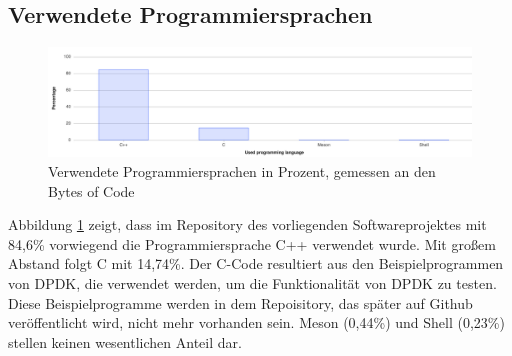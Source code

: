 \documentclass[../review_3.tex]{subfiles}
\begin{document}
\subsection{Verwendete Programmiersprachen}
\begin{figure} [H]
    \centering
    \includegraphics[width =0.95\linewidth]{img/gitlab1.png}
    \caption{Verwendete Programmiersprachen in Prozent, gemessen an den Bytes of Code}
    \label{gitlab1}
\end{figure}
Abbildung \ref{gitlab1} zeigt, dass im Repository des vorliegenden Softwareprojektes mit 84,6\%  vorwiegend die Programmiersprache C++ verwendet wurde. Mit großem Abstand folgt C mit 14,74\%. Der C-Code resultiert aus den Beispielprogrammen von DPDK, die verwendet werden, um die Funktionalität von DPDK zu testen. Diese Beispielprogramme werden in dem Repoisitory, das später auf Github veröffentlicht wird, nicht mehr vorhanden sein. Meson (0,44\%) und Shell (0,23\%) stellen keinen wesentlichen Anteil dar.
\end{document}
